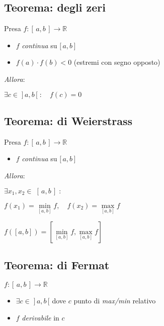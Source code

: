 \documentclass{article}
\begin{document}
\subsection{Teorema: degli zeri}
Presa $f: [ \, a, b \, ] \longrightarrow \mathbb{R}$

\begin{itemize}
\item
  $f$ \emph{continua} su $\boldsymbol{[} \, a, b \, \boldsymbol{]}$
\item
  $f(a) \cdot f(b) < 0$ (estremi con segno opposto)
\end{itemize}

\noindent \emph{Allora}:

\setlength{\parindent}{.25in}
$\exists c \in \; ] \, a, b \, [ \; : \quad f(c) = 0$

\subsection{Teorema: di Weierstrass}
Presa $f: [ \, a, b \, ] \longrightarrow \mathbb{R}$

\begin{itemize}
\item
  $f$ \emph{continua} su $\boldsymbol{[} \, a, b \, \boldsymbol{]}$
\end{itemize}

\noindent\emph{Allora}:

\setlength{\parindent}{.25in}
  $
    \exists x_1, x_2 \in \; [ \, a, b \, ] \; :
  $

\setlength{\parindent}{.25in}
  $
    f(x_1) = \min\limits_{[a, b]} f, \quad f(x_2) = \max\limits_{[a, b]} f
  $

\setlength{\parindent}{0in}

\setlength{\parindent}{.25in}
  $f([a, b]) = [\min\limits_{[a, b]} f, \max\limits_{[a, b]} f]$

\subsection{Teorema: di Fermat}
$f: [ \, a, b \, ] \longrightarrow \mathbb{R}$

\begin{itemize}
\item
  $\exists c \in \; ] \, a, b \, [ $ dove $c$ punto di \emph{max/min} relativo
\item
  $f$ \emph{derivabile} in $c$
\end{itemize}
\end{document}
